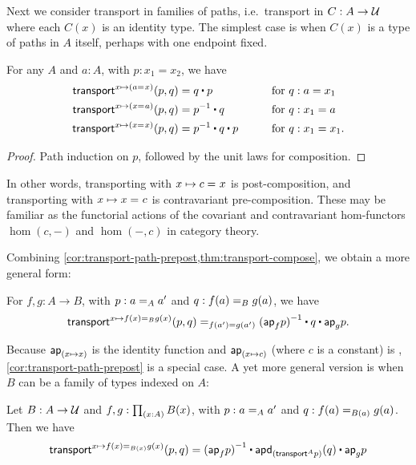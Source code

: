 Next we consider transport in families of paths, i.e.\ transport in $C:A\to\type$ where each $C(x)$ is an identity type.
The simplest case is when $C(x)$ is a type of paths in $A$ itself, perhaps with one endpoint fixed.

\begin{lem}\label{cor:transport-path-prepost}
  For any $A$ and $a:A$, with $p:x_1=x_2$, we have
  \begin{alignat*}{2}
    \transfib{x \mapsto (\id{a}{x})} {p} {q} &= q \ct p
    && \qquad\text{for } q:a=x_1\\
    \transfib{x \mapsto (\id{x}{a})} {p} {q} &= \opp {p} \ct q 
    && \qquad\text{for } q:x_1=a\\
    \transfib{x \mapsto (\id{x}{x})} {p} {q} &= \opp{p} \ct q \ct p
    && \qquad\text{for } q:x_1=x_1.
  \end{alignat*}
\end{lem}
\begin{proof}
  Path induction on $p$, followed by the unit laws for composition.
\end{proof}

In other words, transporting with ${x \mapsto \id{c}{x}}$ is post-composition, and transporting with ${x \mapsto \id{x}{c}}$ is contravariant pre-composition.
These may be familiar as the functorial actions of the covariant and contravariant hom-functors $\hom(c,-)$ and $\hom(-,c)$ in category theory.

Combining \autoref{cor:transport-path-prepost,thm:transport-compose}, we obtain a more general form:

\begin{thm}\label{thm:transport-path}
  For $f,g:A\to B$, with $p : \id[A]{a}{a'}$ and $q : \id[B]{f(a)}{g(a)}$, we have
  \begin{equation*}
    \id[f(a') = g(a')]{\transfib{x \mapsto \id[B]{f(x)}{g(x)}}{p}{q}}
    {\opp{(\apfunc{f}{p})} \ct q \ct \apfunc{g}{p}}.
  \end{equation*}
\end{thm}

Because $\apfunc{(x \mapsto x)}$ is the identity function and $\apfunc{(x \mapsto c)}$ (where $c$ is a constant) is , \autoref{cor:transport-path-prepost} is a special case.
A yet more general version is when $B$ can be a family of types indexed on $A$:

\begin{thm}\label{thm:transport-path2}
  Let $B : A \to \type$ and $f,g : \prd{x:A} B(x)$, with $p : \id[A]{a}{a'}$ and $q : \id[B(a)]{f(a)}{g(a)}$.
  Then we have
  \begin{equation*}
    \transfib{x \mapsto \id[B(x)]{f(x)}{g(x)}}{p}{q} = 
    \opp{(\apfunc{f}{p})} \ct \apdfunc{(\transfibf{A}{p})}(q) \ct \apfunc{g}{p}
  \end{equation*}
\end{thm}

